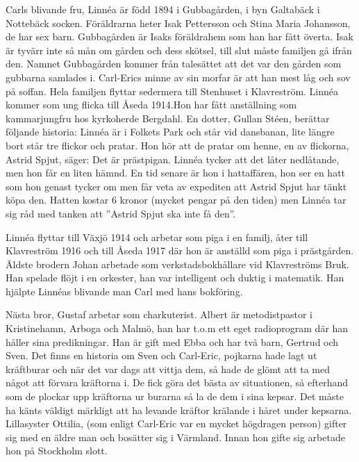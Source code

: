Carls blivande fru, Linnéa är född 1894 i Gubbagården, i byn Galtabäck i Nottebäck socken. Föräldrarna heter Isak Pettersson och Stina Maria Johansson, de har sex barn. Gubbagården är Isaks föräldrahem som han har fått överta. Isak är tyvärr inte så mån om gården och dess skötsel, till slut måste familjen gå ifrån den. Namnet Gubbagården kommer från talesättet att det var den gården som gubbarna samlades i. Carl-Erics minne av sin morfar är att han mest låg och sov på soffan. Hela familjen flyttar sedermera till Stenhuset i Klavreström. Linnéa kommer som ung flicka till Åseda 1914.Hon har fått anställning som kammarjungfru hos kyrkoherde Bergdahl. En dotter, Gullan Stéen, berättar följande historia: Linnéa är i Folkets Park och står vid dansbanan, lite längre bort står tre flickor och pratar. Hon hör att de pratar om henne, en av flickorna, Astrid Spjut, säger: Det är prästpigan. Linnéa tycker att det låter nedlåtande, men hon får en liten hämnd. En tid senare är hon i hattaffären, hon ser en hatt som hon genast tycker om men får veta av expediten att Astrid Spjut har tänkt köpa den. Hatten kostar 6 kronor (mycket pengar på den tiden) men Linnéa tar sig råd med tanken att ”Astrid Spjut ska inte få den”.

Linnéa flyttar till Växjö 1914 och arbetar som piga i en familj, åter till Klavreström 1916 och till Åseda 1917 där hon är anställd som piga i prästgården.
Äldste brodern Johan arbetade som verkstadsbokhållare vid Klavreströms Bruk. Han spelade flöjt i en orkester, han var intelligent och duktig i matematik. Han hjälpte Linnéas blivande man Carl med hans bokföring. 

Nästa bror, Gustaf arbetar som charkuterist. Albert är metodistpastor i Kristinehamn, Arboga och Malmö, han har t.o.m ett eget radioprogram där han håller sina predikningar. Han är gift med Ebba och har två barn, Gertrud och Sven. Det finns en historia om Sven och Carl-Eric, pojkarna hade lagt ut kräftburar och när det var dags att vittja dem, så hade de glömt att ta med något att förvara kräftorna i. De fick göra det bästa av situationen, så efterhand som de plockar upp kräftorna ur burarna så la de dem i sina kepsar. Det måste ha känts väldigt märkligt att ha levande kräftor krälande i håret  under kepsarna. Lillasyster Ottilia, (som enligt Carl-Eric var en mycket högdragen person) gifter sig med en äldre man och bosätter sig i Värmland. Innan hon gifte sig arbetade hon på Stockholm slott.

